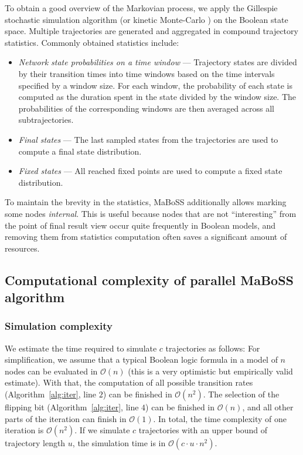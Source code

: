 \documentclass[sn-mathphys-num]{sn-jnl}%
\begin{document}
To obtain a good overview of the Markovian process, we apply the Gillespie stochastic simulation algorithm\cite{gillespie1976general} (or kinetic Monte-Carlo\cite{young1966monte}
) on the Boolean state space. Multiple trajectories are generated and aggregated in compound trajectory statistics. Commonly obtained statistics include:
\begin{itemize}
    \item \emph{Network state probabilities on a time window} --- Trajectory states are divided by their transition times into time windows based on the time intervals specified by a window size. For each window, the probability of each state is computed as the duration spent in the state divided by the window size. The probabilities of the corresponding windows are then averaged across all subtrajectories.
    \item \emph{Final states} --- The last sampled states from the trajectories are used to compute a final state distribution.
    \item \emph{Fixed states} --- All reached fixed points are used to compute a fixed state distribution.
\end{itemize}

To maintain the brevity in the statistics, MaBoSS additionally allows marking some nodes \emph{internal}.
This is useful because nodes that are not ``interesting'' from the point of final result view occur quite frequently in Boolean models, and removing them from statistics computation often saves a significant amount of resources.

\subsection{Computational complexity of parallel MaBoSS algorithm}

\subsubsection{Simulation complexity}

We estimate the time required to simulate $c$ trajectories as follows:
For simplification, we assume that a typical Boolean logic formula in a model of $n$ nodes can be evaluated in $\mathcal{O}(n)$ (this is a very optimistic but empirically valid estimate). With that, the computation of all possible transition rates (Algorithm~\ref{alg:iter}, line $2$) can be finished in $\mathcal{O}(n^2)$. The selection of the flipping bit (Algorithm~\ref{alg:iter}, line $4$) can be finished in $\mathcal{O}(n)$, and all other parts of the iteration can finish in $\mathcal{O}(1)$. In total, the time complexity of one iteration is $\mathcal{O}(n^2)$. If we simulate $c$ trajectories with an upper bound of trajectory length $u$, the simulation time is in $\mathcal{O}(c \cdot u \cdot n^2)$.
\end{document}
